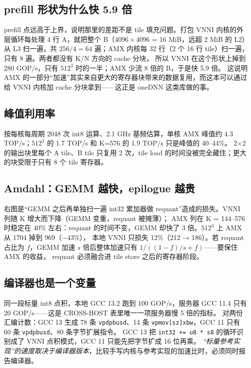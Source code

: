 \documentclass[11pt,a4paper]{ctexart}
\begin{document}
\subsection{prefill 形状为什么快 5.9 倍}
prefill 点远高于上界，说明那里的差距不是 tile 填充问题。打包 VNNI 内核的外层循环每处理 4 行 A，就把整个 B（$4096\times4096$ = 16 MiB，远超 2 MiB 的 L2）
从 L3 扫一遍，共 $256/4=64$ 遍；AMX 内核每 32 行（2 个 16 行 tile）扫一遍，只有 8 遍。两者都没有 K/N 方向的 cache 分块，
所以 VNNI 在这个形状上掉到 280 GOP/s，只有 $512^3$ 时的一半；AMX 少流 8 倍的 B，于是快 5.9 倍。
这说明 AMX 的一部分“加速”其实来自更大的寄存器块带来的数据复用，而这本可以通过给 VNNI 内核加 cache 分块拿到——这正是 oneDNN 这类库做的事。

\subsection{峰值利用率}
按每核每周期 2048 次 int8 运算、2.1 GHz 基频估算，单核 AMX 峰值约 4.3 TOP/s；$512^3$ 的 1.7 TOP/s 和 K=576 的 1.9 TOP/s 只是峰值的 40--44\%。
2×2 的输出块里每个 A tile、B tile 只复用 2 次，tile load 的时间没被完全藏住；更大的块受限于只有 8 个 tile 寄存器。

\subsection{Amdahl：GEMM 越快，epilogue 越贵}
 右图是“GEMM 之后再单独扫一遍 int32 累加器做 requant”造成的损失。VNNI 列随 K 增大而下降（GEMM 变重，requant 被摊薄）；
AMX 列在 K = 144--576 时稳定在 40\% 左右：requant 的时间不变，GEMM 却快了 3 倍。$512^3$ 上 AMX 从 1704 掉到 969（$-43\%$），
本地 VNNI 只损失 12\%（212 → 186）。若 requant 占比为 $f$，GEMM 加速 $s$ 倍后整体加速只有 $1/((1-f)/s + f)$——要保住 AMX 的收益，
requant 必须融合进 tile store 之后的寄存器阶段。

\subsection{编译器也是一个变量}
同一段标量 int8 点积，本地 GCC 13.2 跑到 100 GOP/s，服务器 GCC 11.4 只有 20 GOP/s——这是 CROSS-HOST 表里唯一一项服务器慢 5 倍的指标。
对两份汇编计数：GCC 13 生成 78 条 \texttt{vpdpbusd}、14 条 \texttt{vpmov[sz]xbw}，GCC 11 只有 60 条 \texttt{vpdpbusd}、80 条字节扩展指令。
GCC 13 把 \texttt{int32 += u8 * s8} 的循环识别成了 VNNI 点积模式，GCC 11 只能先把字节扩成 16 位再乘。
\emph{“标量参考实现”的速度取决于编译器版本}，比较手写内核与参考实现的加速比时，必须同时报告编译器。
\end{document}
